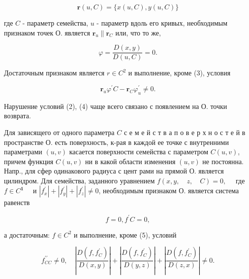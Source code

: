 \documentclass[10pt]{article}
\begin{document}
\[

\boldsymbol{r}(u, C)=\{x(u, C), y(u, C)\}

\]



где $C$ - параметр семейства, $u$ - параметр вдоль его кривых, необходимым признаком точек О. является $\boldsymbol{r}_{u} \| \boldsymbol{r}_{C}$ или, что то же,



\[

\varphi=\frac{D(x, y)}{D(u, C)}=0 .

\]



Достаточным признаком является $r \in C^{2}$ и выполнение, кроме (3), условия



\[

\boldsymbol{r}_{u} \varphi^{\prime} C-\boldsymbol{r}_{C} \varphi_{u}^{\prime} \neq 0 .

\]



Нарушение условий (2), (4) чаще всего связано с появлением на О. точки возврата.



Для зависящего от одного параметра $C$ с е м е й с т в а п о в е р х н о с т е й в пространстве О. есть поверхность, к-рая в каждой ее точке с внутренними параметрами $(u, v)$ касается поверхности семейства с параметром $C(u, v)$, причем функция $C(u, v)$ ни в какой области изменения $(u, v)$ не постоянна. Напр., для сфер одинакового радиуса с цент рами на прямой О. является цилиндром. Для семейства, заданного уравнением $f(x, y, \quad z, \quad C)=0, \quad$ где $f \in C^{\mathbf{1}} \quad$ и $\left|f_{x}^{\prime}\right|+\left|f_{y}^{\prime}\right|+\left|f_{z}^{\prime}\right| \neq 0$, необходимым признаком О. является система равенств



\[

f=0, f^{\prime} C=0,

\]



а достаточным: $f \in C^{2}$ и выполнение, кроме (5), условий



\[

f_{C C}^{\prime \prime} \neq 0, \quad\left|\frac{D\left(f, f_{C}^{\prime}\right)}{D(x, y)}\right|+\left|\frac{D\left(f, f_{C}^{\prime}\right)}{D(y, z)}\right|+\left|\frac{D\left(f, f_{C}^{\prime}\right)}{D(z, x)}\right| \neq 0 .

\]
\end{document}
